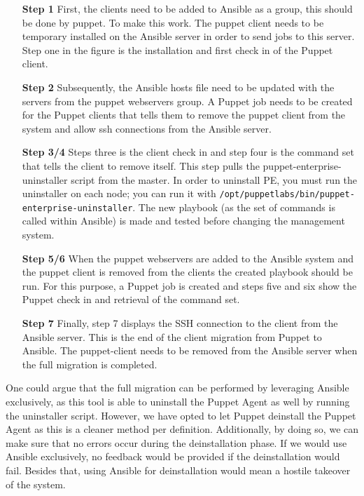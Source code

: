 \indent
\begin{itemize}
    \item[\bf Step 1] First, the clients need to be added to Ansible as a group, this should be done by puppet. To make this work. The puppet client needs to be temporary installed on the Ansible server in order to send jobs to this server. Step one in the figure is the installation and first check in of the Puppet client.
    \item[\bf Step 2] Subsequently, the Ansible hosts file need to be updated with the servers from the puppet webservers group. A Puppet job needs to be created for the Puppet clients that tells them to remove the puppet client from the system and allow ssh connections from the Ansible server.
    \item[\bf Step 3/4] Steps three is the client check in and step four is the command set that tells the client to remove itself. This step pulls the puppet-enterprise-uninstaller script from the master. In order to uninstall PE, you must run the uninstaller on each node; you can run it with \texttt{/opt/puppetlabs/bin/puppet-enterprise-uninstaller}. The new playbook (as the set of commands is called within Ansible) is made and tested before changing the management system.
    \item[\bf Step 5/6] When the puppet webservers are added to the Ansible system and the puppet client is removed from the clients the created playbook should be run. For this purpose, a Puppet job is created and steps five and six show the Puppet check in and retrieval of the command set.
    \item[\bf Step 7] Finally, step 7 displays the SSH connection to the client from the Ansible server. This is the end of the client migration from Puppet to Ansible. The puppet-client needs to be removed from the Ansible server when the full migration is completed.
\end{itemize}

One could argue that the full migration can be performed by leveraging Ansible exclusively, as this tool is able to uninstall the Puppet Agent as well by running the uninstaller script. However, we have opted to let Puppet deinstall the Puppet Agent as this is a cleaner method per definition. Additionally, by doing so, we can make sure that no errors occur during the deinstallation phase. If we would use Ansible exclusively, no feedback would be provided if the deinstallation would fail. Besides that, using Ansible for deinstallation would mean a hostile takeover of the system. 

